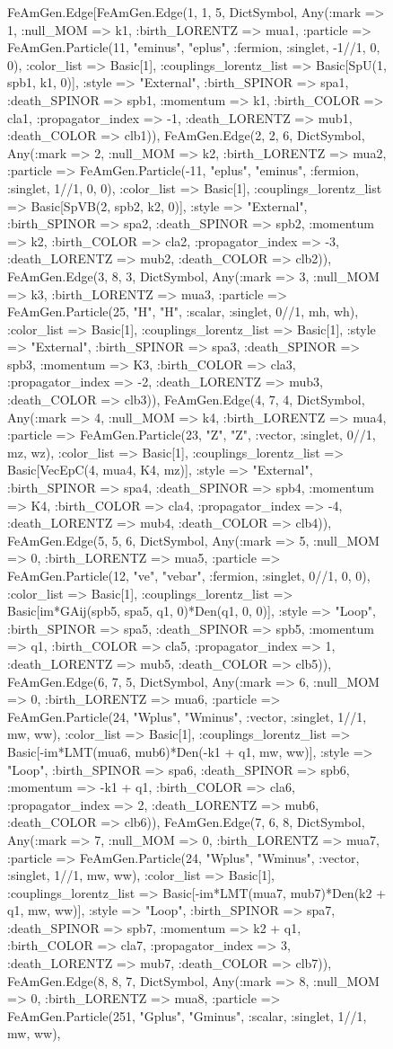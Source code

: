 \documentclass{revtex4}
\begin{document}
\begin{figure}[!htb]
\begin{center}
{FeAmGen.Edge[FeAmGen.Edge(1, 1, 5, Dict{Symbol, Any}(:mark => 1, :null_MOM => k1, :birth_LORENTZ => mua1, :particle => FeAmGen.Particle(11, "eminus", "eplus", :fermion, :singlet, -1//1, 0, 0), :color_list => Basic[1], :couplings_lorentz_list => Basic[SpU(1, spb1, k1, 0)], :style => "External", :birth_SPINOR => spa1, :death_SPINOR => spb1, :momentum => k1, :birth_COLOR => cla1, :propagator_index => -1, :death_LORENTZ => mub1, :death_COLOR => clb1)), FeAmGen.Edge(2, 2, 6, Dict{Symbol, Any}(:mark => 2, :null_MOM => k2, :birth_LORENTZ => mua2, :particle => FeAmGen.Particle(-11, "eplus", "eminus", :fermion, :singlet, 1//1, 0, 0), :color_list => Basic[1], :couplings_lorentz_list => Basic[SpVB(2, spb2, k2, 0)], :style => "External", :birth_SPINOR => spa2, :death_SPINOR => spb2, :momentum => k2, :birth_COLOR => cla2, :propagator_index => -3, :death_LORENTZ => mub2, :death_COLOR => clb2)), FeAmGen.Edge(3, 8, 3, Dict{Symbol, Any}(:mark => 3, :null_MOM => k3, :birth_LORENTZ => mua3, :particle => FeAmGen.Particle(25, "H", "H", :scalar, :singlet, 0//1, mh, wh), :color_list => Basic[1], :couplings_lorentz_list => Basic[1], :style => "External", :birth_SPINOR => spa3, :death_SPINOR => spb3, :momentum => K3, :birth_COLOR => cla3, :propagator_index => -2, :death_LORENTZ => mub3, :death_COLOR => clb3)), FeAmGen.Edge(4, 7, 4, Dict{Symbol, Any}(:mark => 4, :null_MOM => k4, :birth_LORENTZ => mua4, :particle => FeAmGen.Particle(23, "Z", "Z", :vector, :singlet, 0//1, mz, wz), :color_list => Basic[1], :couplings_lorentz_list => Basic[VecEpC(4, mua4, K4, mz)], :style => "External", :birth_SPINOR => spa4, :death_SPINOR => spb4, :momentum => K4, :birth_COLOR => cla4, :propagator_index => -4, :death_LORENTZ => mub4, :death_COLOR => clb4)), FeAmGen.Edge(5, 5, 6, Dict{Symbol, Any}(:mark => 5, :null_MOM => 0, :birth_LORENTZ => mua5, :particle => FeAmGen.Particle(12, "ve", "vebar", :fermion, :singlet, 0//1, 0, 0), :color_list => Basic[1], :couplings_lorentz_list => Basic[im*GAij(spb5, spa5, q1, 0)*Den(q1, 0, 0)], :style => "Loop", :birth_SPINOR => spa5, :death_SPINOR => spb5, :momentum => q1, :birth_COLOR => cla5, :propagator_index => 1, :death_LORENTZ => mub5, :death_COLOR => clb5)), FeAmGen.Edge(6, 7, 5, Dict{Symbol, Any}(:mark => 6, :null_MOM => 0, :birth_LORENTZ => mua6, :particle => FeAmGen.Particle(24, "Wplus", "Wminus", :vector, :singlet, 1//1, mw, ww), :color_list => Basic[1], :couplings_lorentz_list => Basic[-im*LMT(mua6, mub6)*Den(-k1 + q1, mw, ww)], :style => "Loop", :birth_SPINOR => spa6, :death_SPINOR => spb6, :momentum => -k1 + q1, :birth_COLOR => cla6, :propagator_index => 2, :death_LORENTZ => mub6, :death_COLOR => clb6)), FeAmGen.Edge(7, 6, 8, Dict{Symbol, Any}(:mark => 7, :null_MOM => 0, :birth_LORENTZ => mua7, :particle => FeAmGen.Particle(24, "Wplus", "Wminus", :vector, :singlet, 1//1, mw, ww), :color_list => Basic[1], :couplings_lorentz_list => Basic[-im*LMT(mua7, mub7)*Den(k2 + q1, mw, ww)], :style => "Loop", :birth_SPINOR => spa7, :death_SPINOR => spb7, :momentum => k2 + q1, :birth_COLOR => cla7, :propagator_index => 3, :death_LORENTZ => mub7, :death_COLOR => clb7)), FeAmGen.Edge(8, 8, 7, Dict{Symbol, Any}(:mark => 8, :null_MOM => 0, :birth_LORENTZ => mua8, :particle => FeAmGen.Particle(251, "Gplus", "Gminus", :scalar, :singlet, 1//1, mw, ww), }
\end{center}
\end{figure}
\end{document}

